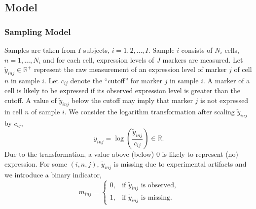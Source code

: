 \documentclass[12pt,]{article}
\providecommand{\tightlist}{%
  \setlength{\itemsep}{0pt}\setlength{\parskip}{0pt}}
\newcommand{\p}[1]{\left(#1\right)}
\begin{document}
\subsection{Model}\label{prob-model}
\subsubsection{Sampling Model} 
Samples are taken from \(I\) subjects, \(i = 1,2,...,I\). Sample \(i\)
consists of \(N_i\) cells, \(n=1, \ldots, N_i\) and for each cell,
expression levels of \(J\) markers are measured. Let
\(\tilde{y}_{inj} \in \mathbb{R}^+\) represent the raw measurement of an
expression level of marker \(j\) of cell \(n\) in sample \(i\). Let
\(c_{ij}\) denote the ``cutoff'' for
 marker \(j\) in sample \(i\). A marker of a cell is likely to be expressed if its observed expression level is greater than the cutoff. A value of $\tilde{y}_{inj}$ below the cutoff may imply that marker $j$ is not expressed in cell $n$ of sample $i$.    We consider the logarithm transformation
after scaling \(\tilde{y}_{inj}\) by \(c_{ij}\), \[
y_{inj}=\log\p{\frac{\tilde{y}_{inj}}{c_{ij}}} \in \mathbb{R}.
\]
Due to the transformation, a value above (below) 0 is likely to represent (no) expression. For some \((i, n, j)\), \(\tilde{y}_{inj}\) is missing due to experimental artifacts and we
introduce a binary indicator, \[
m_{inj} = \begin{cases}
  0, & \text{if $\tilde{y}_{inj}$ is observed,} \\
  1, & \text{if $\tilde{y}_{inj}$ is missing.}
\end{cases}
\] %

\def\labelenumi{\arabic{enumi}.}

\end{document}

